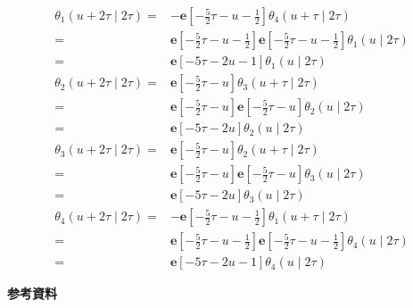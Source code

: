 \documentclass[12pt,b5paper]{ltjsarticle}
\begin{document}
\begin{enumerate}
\begin{enumerate}
             \begin{align}
              \theta_{1} (u + 2\tau \mid 2\tau)
              =& -\mathbf{e}[-\frac{5}{2}\tau-u-\frac{1}{2}]
              \theta_{4} (u+\tau \mid 2\tau )\\
              =& \mathbf{e}[-\frac{5}{2}\tau-u-\frac{1}{2}]
              \mathbf{e}[-\frac{5}{2}\tau-u-\frac{1}{2}]
              \theta_{1} (u \mid 2\tau )\\
              =& \mathbf{e}[-5\tau-2u-1]\theta_{1} (u \mid 2\tau )\\
              \theta_{2} (u + 2\tau \mid 2\tau)
              =& \mathbf{e}[-\frac{5}{2}\tau-u]
              \theta_{3} (u+\tau \mid 2\tau )\\
              =& \mathbf{e}[-\frac{5}{2}\tau-u]
              \mathbf{e}[-\frac{5}{2}\tau-u]
              \theta_{2} (u \mid 2\tau )\\
              =& \mathbf{e}[-5\tau-2u]
              \theta_{2} (u \mid 2\tau )\\
              \theta_{3} (u + 2\tau \mid 2\tau)
              =& \mathbf{e}[-\frac{5}{2}\tau-u]
              \theta_{2} (u+\tau \mid 2\tau )\\
              =& \mathbf{e}[-\frac{5}{2}\tau-u]
              \mathbf{e}[-\frac{5}{2}\tau-u]
              \theta_{3} (u \mid 2\tau )\\
              =& \mathbf{e}[-5\tau-2u]
              \theta_{3} (u \mid 2\tau )\\
              \theta_{4} (u + 2\tau \mid 2\tau)
              =& -\mathbf{e}[-\frac{5}{2}\tau-u-\frac{1}{2}]
              \theta_{1} (u+\tau \mid 2\tau )\\
              =& \mathbf{e}[-\frac{5}{2}\tau-u-\frac{1}{2}]
              \mathbf{e}[-\frac{5}{2}\tau-u-\frac{1}{2}]
              \theta_{4} (u \mid 2\tau )\\
              =& \mathbf{e}[-5\tau-2u-1]\theta_{4} (u \mid 2\tau)
             \end{align}

             \hrulefill

       \end{enumerate}

\end{enumerate}


\hrulefill


\newpage

\textbf{参考資料}
\end{document}
